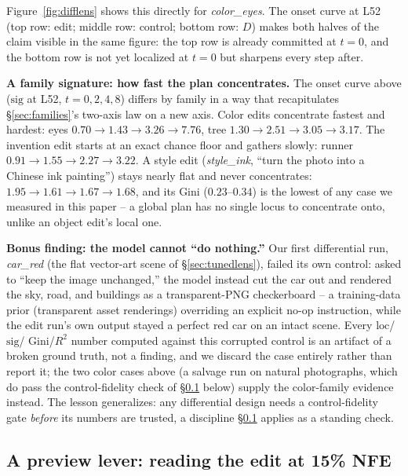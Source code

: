 \documentclass[10pt,twocolumn]{article}
\begin{document}
Figure~\ref{fig:difflens} shows this directly for \emph{color\_eyes}.
The onset curve at L52 (top row: edit; middle row: control; bottom row:
$D$) makes both halves of the claim visible in the same figure: the
top row is already committed at $t{=}0$, and the bottom row is not yet
localized at $t{=}0$ but sharpens every step after.

\textbf{A family signature: how fast the plan concentrates.} The onset
curve above ($\mathrm{sig}$ at L52, $t{=}0,2,4,8$) differs by family in
a way that recapitulates \S\ref{sec:families}'s two-axis law on a new
axis. Color edits concentrate fastest and hardest: eyes
$0.70\to1.43\to3.26\to7.76$, tree $1.30\to2.51\to3.05\to3.17$. The
invention edit starts at an exact chance floor and gathers slowly:
runner $0.91\to1.55\to2.27\to3.22$. A style edit (\emph{style\_ink},
``turn the photo into a Chinese ink painting'') stays nearly flat and
never concentrates: $1.95\to1.61\to1.67\to1.68$, and its Gini
($0.23$--$0.34$) is the lowest of any case we measured in this
paper -- a global plan has no single locus to concentrate onto, unlike
an object edit's local one.

\textbf{Bonus finding: the model cannot ``do nothing.''} Our first
differential run, \emph{car\_red} (the flat vector-art scene of
\S\ref{sec:tunedlens}), failed its own control: asked to ``keep the
image unchanged,'' the model instead cut the car out and rendered the
sky, road, and buildings as a transparent-PNG checkerboard -- a
training-data prior (transparent asset renderings) overriding an
explicit no-op instruction, while the edit run's own output stayed a
perfect red car on an intact scene. Every $\mathrm{loc}$/$\mathrm{sig}$/
Gini/$R^2$ number computed against this corrupted control is an
artifact of a broken ground truth, not a finding, and we discard the
case entirely rather than report it; the two color cases above (a
salvage run on natural photographs, which do pass the control-fidelity
check of \S\ref{sec:previewlever} below) supply the color-family
evidence instead. The lesson generalizes: any differential design needs
a control-fidelity gate \emph{before} its numbers are trusted, a
discipline \S\ref{sec:previewlever} applies as a standing check.

\subsection{A preview lever: reading the edit at 15\% NFE}\label{sec:previewlever}
\end{document}

